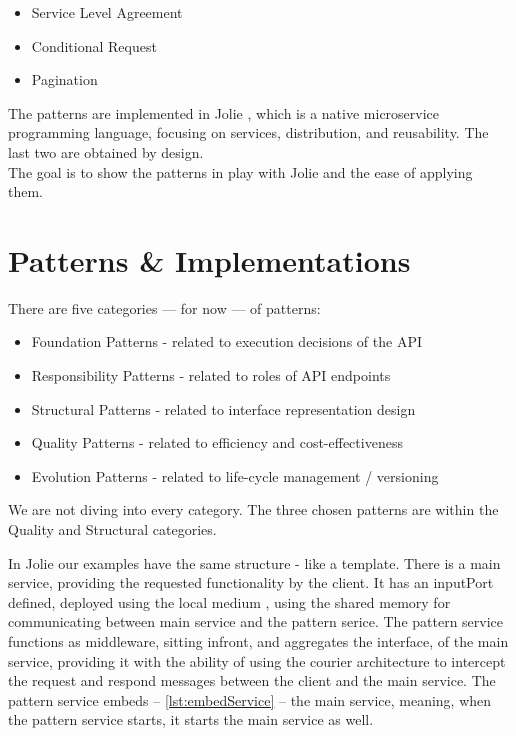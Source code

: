 \documentclass[12pt]{article}
\begin{document}
\begin{itemize}
    \item Service Level Agreement
    \item Conditional Request
    \item Pagination
\end{itemize}

The patterns are implemented in Jolie \cite{JolieAboutPage:1}, which is a native microservice programming language, focusing on services, distribution, and reusability. The last two are obtained by design. \\
The goal is to show the patterns in play with Jolie and the ease of applying them. 

\newpage

\section{Patterns \& Implementations}

There are five categories --- for now --- of  patterns: 

\begin{itemize}
    \item Foundation Patterns - related to execution decisions of the API
    \item Responsibility Patterns - related to roles of API endpoints
    \item Structural Patterns - related to interface representation design
    \item Quality Patterns - related to efficiency and cost-effectiveness
    \item Evolution Patterns - related to life-cycle management / versioning
\end{itemize}

We are not diving into every category. The three chosen patterns are within the Quality and Structural categories. 

In Jolie our examples have the same structure - like a template. There is a main service, providing the requested functionality by the client. It has an inputPort defined, deployed using the local medium \cite{LocalLoc:1}, using the shared memory for communicating between main service and the pattern serice. The pattern service functions as middleware, sitting infront, and aggregates the interface, of the main service, providing it with the ability of using the courier \cite{Courier:1} architecture to intercept the request and respond messages between the client and the main service. The pattern service embeds -- \ref{lst:embedService} -- the main service, meaning, when the pattern service starts, it starts the main service as well. 
\end{document}
